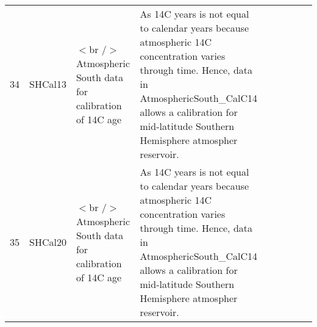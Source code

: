 \begin{table}[ht]
\begin{tabular}{rllllllll}
 \\ 
  34 & SHCal13 & $<$br /$>$ Atmospheric South data for calibration of 14C age  & As 14C years is not equal to calendar years because atmospheric 14C concentration varies through time. Hence, data in AtmosphericSouth\_CalC14 allows a calibration for mid-latitude Southern Hemisphere atmospher reservoir. &  &  &  &  &  \\ 
  35 & SHCal20 & $<$br /$>$ Atmospheric South data for calibration of 14C age  & As 14C years is not equal to calendar years because atmospheric 14C concentration varies through time. Hence, data in AtmosphericSouth\_CalC14 allows a calibration for mid-latitude Southern Hemisphere atmospher reservoir. &  &  &  &  &  \\ 
   \hline
\end{tabular}
\end{table}

